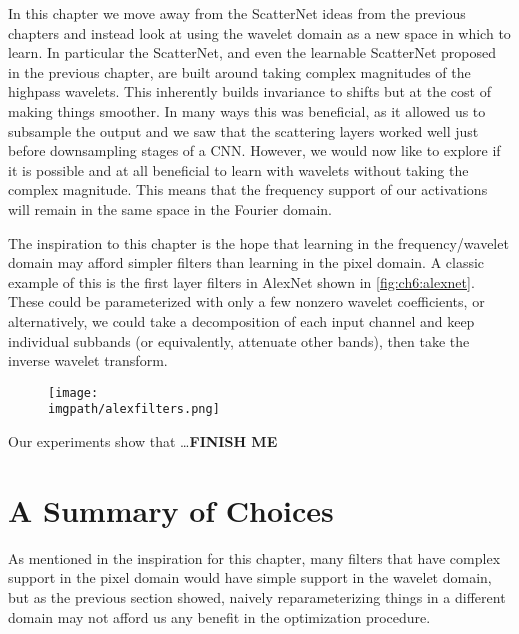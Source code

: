 In this chapter we move away from the ScatterNet ideas from the previous 
chapters and instead look at using the wavelet domain as a new space in which to
learn. In particular the ScatterNet, and even the learnable ScatterNet proposed
in the previous chapter, are built around taking complex magnitudes of the
highpass wavelets. This inherently builds invariance to shifts but at the cost
of making things smoother. In many ways this was beneficial, as it allowed us to
subsample the output and we saw that the scattering layers worked well just 
before downsampling stages of a CNN\@. However, we would now like to explore
if it is possible and at all beneficial to learn with wavelets without taking
the complex magnitude. This means that the frequency support of our activations
will remain in the same space in the Fourier domain. 

The inspiration to this chapter is the hope that learning in the
frequency/wavelet domain may afford simpler filters than learning in the pixel
domain. A classic example of this is the first layer filters in AlexNet shown in
\autoref{fig:ch6:alexnet}. These could be parameterized with only a few nonzero
wavelet coefficients, or alternatively, we could take a 
decomposition of each input channel and keep individual
subbands (or equivalently, attenuate other bands), then take the inverse wavelet
transform. 

\begin{figure}[bt]
  \centering
  \texttt{[image: \\imgpath/alexfilters.png]}
  \label{fig:ch6:alexnet}
\end{figure}

Our experiments show that \ldots \textbf{FINISH ME}


\section{A Summary of Choices}
As mentioned in the inspiration for this chapter, many filters that
have complex support in the pixel domain would have simple support in the
wavelet domain, but as the previous section showed, naively reparameterizing
things in a different domain may not afford us any benefit in the optimization
procedure.

